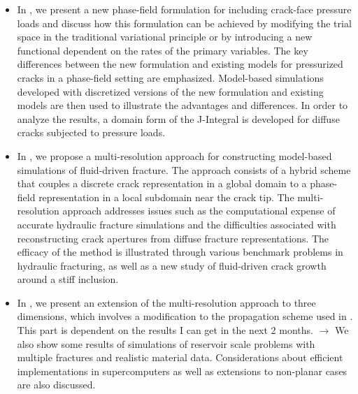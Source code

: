 \begin{itemize}
  \item %
        In , we present a new phase-field formulation for including crack-face pressure loads and discuss how this formulation can be achieved by modifying the trial space in the traditional variational principle or by introducing a new functional dependent on the rates of the primary variables. The key differences between the new formulation and existing models for pressurized cracks in a phase-field setting are emphasized. Model-based simulations developed with discretized versions of the new formulation and existing models are then used to illustrate the advantages and differences. In order to analyze the results, a domain form of the J-Integral is developed for diffuse cracks subjected to pressure loads.
  \item %
        In , we propose a multi-resolution approach for constructing model-based simulations of fluid-driven fracture. The approach consists of a hybrid scheme that couples a discrete crack representation in a global domain to a phase-field representation in a local subdomain near the crack tip. The multi-resolution approach addresses issues such as the computational expense of accurate hydraulic fracture simulations and the difficulties associated with reconstructing crack apertures from diffuse fracture representations. The efficacy of the method is illustrated through various benchmark problems in hydraulic fracturing, as well as a new study of fluid-driven crack growth around a stiff inclusion.
  \item %
        In , we present an extension of the multi-resolution approach to three dimensions, which involves a modification to the propagation scheme used in . {\color{red}This part is dependent on the results I can get in the next 2 months. $\rightarrow$ } {\color{blue}We also show some results of simulations of reservoir scale problems with multiple fractures and realistic material data. Considerations about efficient implementations in supercomputers as well as extensions to non-planar cases are also discussed.}

\end{itemize}
